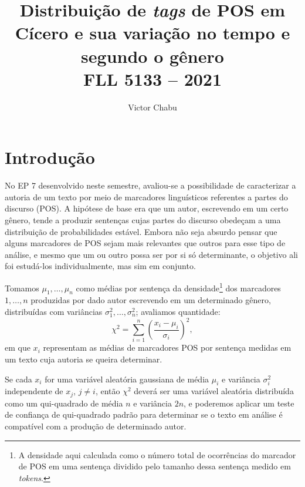 \documentclass[10pt,a4paper,onecolumn]{article}
\theoremstyle{definition}
\theoremstyle{remark}
\begin{document}
\title{\huge \textbf{Distribuição de \emph{tags} de POS em Cícero e sua variação no tempo e segundo o gênero} \\ \Large FLL 5133 -- 2021}
\author{\large Victor Chabu} 
\date{}
\maketitle

\section{Introdução}
No EP 7 desenvolvido neste semestre, avaliou-se a possibilidade de caracterizar a autoria de um texto por meio de marcadores linguísticos referentes a partes do discurso (POS). A hipótese de base era que um autor, escrevendo em um certo gênero, tende a produzir sentenças cujas partes do discurso obedeçam a uma distribuição de probabilidades estável. Embora não seja absurdo pensar que alguns marcadores de POS sejam mais relevantes que outros para esse tipo de análise, e mesmo que um ou outro possa ser por si só determinante, o objetivo ali foi estudá-los individualmente, mas sim em conjunto. 

Tomamos $\mu_1,\dots,\mu_n$ como médias por sentença da densidade\footnote{A densidade aqui calculada como o número total de ocorrências do marcador de POS em uma sentença dividido pelo tamanho dessa sentença medido em \emph{tokens}.} dos marcadores $1,\dots,n$ produzidas por dado autor escrevendo em um determinado gênero, distribuídas com variâncias $\sigma_1^2,\dots,\sigma_n^2$; avaliamos quantidade:
\begin{equation}\label{eq:chi}
	\chi^2 = \sum_{i = 1}^{n} \left( \frac{x_i-\mu_i}{\sigma_i} \right)^2,
\end{equation}
em que $x_i$ representam as médias de marcadores POS por sentença medidas em um texto cuja autoria se queira determinar.

Se cada $x_i$ for uma variável aleatória gaussiana de média $\mu_i$ e variância $\sigma_i^2$ independente de $x_j$, $j \neq i$, então $\chi^2$ deverá ser uma variável aleatória distribuída como um qui-quadrado de média $n$ e variância $2n$, e poderemos aplicar um teste de confiança de qui-quadrado padrão para determinar se o texto em análise é compatível com a produção de determinado autor.
\end{document}
